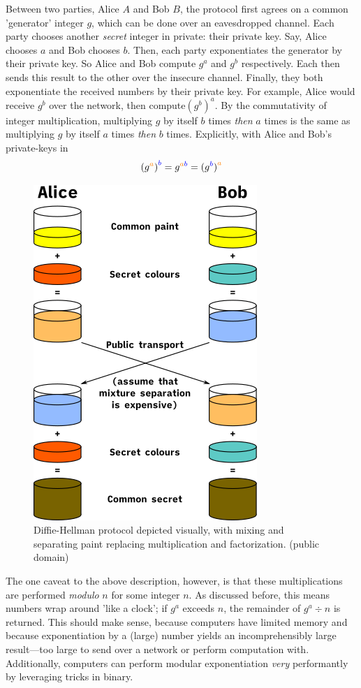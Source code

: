 \documentclass[11pt, a4paper]{report}
\begin{document}
Between two parties, Alice $A$ and Bob $B$, the protocol first agrees on a common 'generator' integer $g$, which can be done over an eavesdropped channel. Each party chooses another \textit{secret} integer in private: their private key. Say, Alice chooses $a$ and Bob chooses $b$. Then, each party exponentiates the generator by their private key. So Alice and Bob compute $g^a$ and $g^b$ respectively. Each then sends this result to the other over the insecure channel. Finally, they both exponentiate the received numbers by their private key. For example, Alice would receive $g^b$ over the network, then compute$(g^b)^a$.
By the commutativity of integer multiplication, multiplying $g$ by itself $b$ times \textit{then} $a$ times is the same as  multiplying $g$ by itself $a$ times \textit{then} $b$ times. Explicitly, with Alice and Bob's private-keys in \color{orange}{amber} \color{black}{and} \color{blue}{blue} \color{black}{respectively:}
\[ (g^{\color{orange}{a}}\color{black}{)}^{\color{blue}{b}} = g^{\color{orange}{a}\color{blue}{b}} = (g^{\color{blue}{b}}\color{black}{)}^{\color{orange}{a}}  \]

\begin{figure}[ht]
\begin{center}
\includegraphics[width = .4\linewidth]{colors} 
\caption{Diffie-Hellman protocol depicted visually, with mixing and separating paint replacing multiplication and factorization. (public domain)}
\end{center}
\end{figure}

The one caveat to the above description, however, is that these multiplications are performed \textit{modulo} $n$ for some integer $n$. As discussed before, this means numbers wrap around 'like a clock'; if $g^a$ exceeds $n$, the remainder of $g^a \div n$ is returned. This should make sense, because computers have limited memory and because exponentiation by a (large) number yields an incomprehensibly large result—too large to send over a network or perform computation with. Additionally, computers can perform modular exponentiation \textit{very} performantly by leveraging tricks in binary.\autocite{bunimov}
\end{document}

